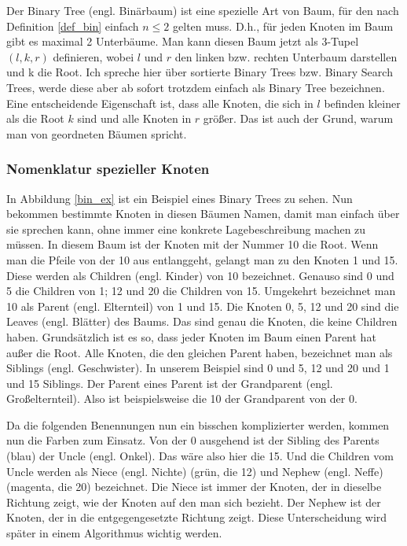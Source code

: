 \documentclass[11pt]{article}
\begin{document}
Der Binary Tree (engl. Binärbaum) ist eine spezielle Art von Baum, für den nach Definition \ref{def_bin} einfach $n \leq 2$ gelten muss. D.h., für jeden Knoten im Baum gibt es maximal 2 Unterbäume.
Man kann diesen Baum jetzt als 3-Tupel $(l, k, r)$ definieren, wobei $l$ und $r$ den linken bzw. rechten Unterbaum darstellen und k die Root. Ich spreche hier über sortierte Binary Trees bzw. Binary Search Trees, werde diese aber ab sofort trotzdem einfach als Binary Tree bezeichnen.
Eine entscheidende Eigenschaft ist, dass alle Knoten, die sich in $l$ befinden kleiner als die Root $k$ sind und alle Knoten in $r$ größer.
Das ist auch der Grund, warum man von geordneten Bäumen spricht. \cite[S. 147]{aad}

\subsubsection{Nomenklatur spezieller Knoten}

In Abbildung \ref{bin_ex} ist ein Beispiel eines Binary Trees zu sehen. Nun bekommen bestimmte Knoten in diesen Bäumen Namen, damit man einfach über sie sprechen kann, ohne immer
eine konkrete Lagebeschreibung machen zu müssen. In diesem Baum ist der Knoten mit der Nummer 10 die Root.
Wenn man die Pfeile von der 10 aus entlanggeht, gelangt man zu den Knoten 1 und 15. Diese werden als Children (engl. Kinder) von 10 bezeichnet. Genauso sind 0 und 5 die Children von 1; 12 und 20 die Children von 15.
Umgekehrt bezeichnet man 10 als Parent (engl. Elternteil) von 1 und 15. 
Die Knoten 0, 5, 12 und 20 sind die Leaves (engl. Blätter) des Baums. Das sind genau die Knoten, die keine Children haben.
Grundsätzlich ist es so, dass jeder Knoten im Baum einen Parent hat außer die Root.
Alle Knoten, die den gleichen Parent haben, bezeichnet man als Siblings (engl. Geschwister). In unserem Beispiel sind 0 und 5, 12 und 20 und 1 und 15 Siblings. 
Der Parent eines Parent ist der Grandparent (engl. Großelternteil). Also ist beispielsweise die 10 der Grandparent von der 0.
\cite[S.311]{aop}

Da die folgenden Benennungen nun ein bisschen komplizierter werden, kommen nun die Farben zum Einsatz. Von der 0 ausgehend ist der Sibling des Parents (blau) der Uncle (engl. Onkel). Das wäre also hier die 15.
Und die Children vom Uncle werden als Niece (engl. Nichte) (grün, die 12) und Nephew (engl. Neffe) (magenta, die 20) bezeichnet. Die Niece ist immer der Knoten, der in dieselbe Richtung zeigt, wie der Knoten auf den man sich bezieht. Der Nephew ist der Knoten, der in die entgegengesetzte Richtung zeigt.
Diese Unterscheidung wird später in einem Algorithmus wichtig werden.
\end{document}
